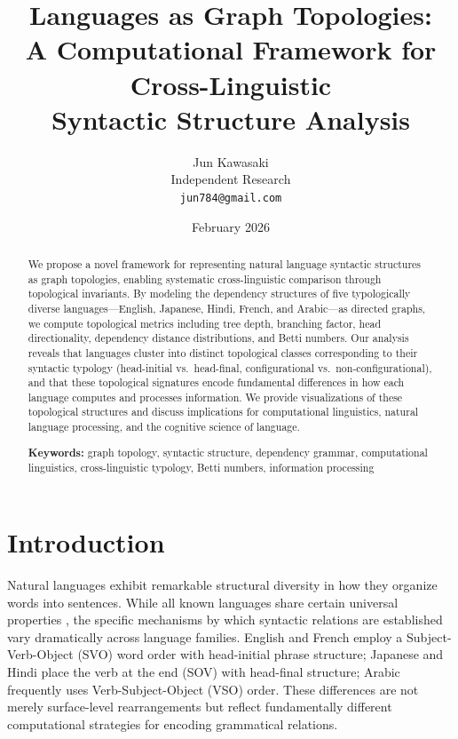 \documentclass[11pt,a4paper]{article}
\title{\textbf{Languages as Graph Topologies:\\
A Computational Framework for Cross-Linguistic\\Syntactic Structure Analysis}}
\author{
  Jun Kawasaki\\
  Independent Research\\
  \texttt{jun784@gmail.com}
}
\date{February 2026}
\begin{document}
\maketitle

\begin{abstract}
We propose a novel framework for representing natural language syntactic
structures as graph topologies, enabling systematic cross-linguistic
comparison through topological invariants. By modeling the dependency
structures of five typologically diverse languages---English, Japanese,
Hindi, French, and Arabic---as directed graphs, we compute topological
metrics including tree depth, branching factor, head directionality,
dependency distance distributions, and Betti numbers. Our analysis
reveals that languages cluster into distinct topological classes
corresponding to their syntactic typology (head-initial vs.\ head-final,
configurational vs.\ non-configurational), and that these topological
signatures encode fundamental differences in how each language computes
and processes information. We provide visualizations of these topological
structures and discuss implications for computational linguistics,
natural language processing, and the cognitive science of language.

\medskip
\noindent\textbf{Keywords:} graph topology, syntactic structure,
dependency grammar, computational linguistics, cross-linguistic
typology, Betti numbers, information processing
\end{abstract}

\section{Introduction}
\label{sec:intro}

Natural languages exhibit remarkable structural diversity in how they
organize words into sentences. While all known languages share certain
universal properties \citep{chomsky1965,greenberg1963}, the specific
mechanisms by which syntactic relations are established vary dramatically
across language families. English and French employ a Subject-Verb-Object
(SVO) word order with head-initial phrase structure; Japanese and Hindi
place the verb at the end (SOV) with head-final structure; Arabic
frequently uses Verb-Subject-Object (VSO) order. These differences are
not merely surface-level rearrangements but reflect fundamentally
different computational strategies for encoding grammatical relations.
\end{document}
